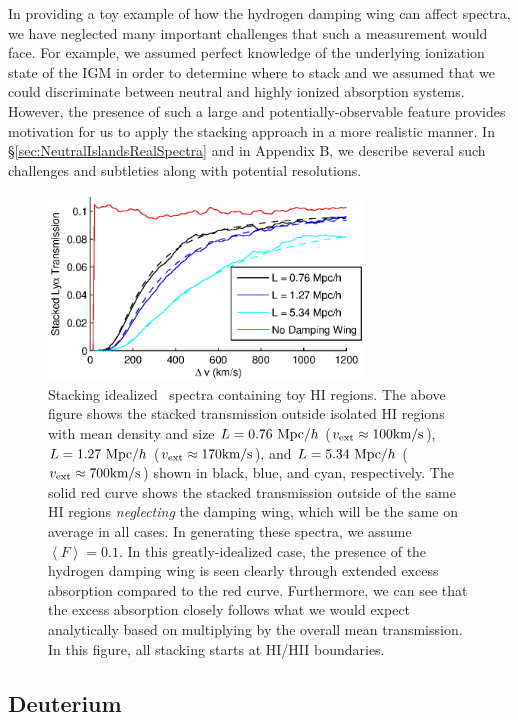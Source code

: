In providing a toy example of how the hydrogen damping wing can affect spectra, we have neglected many important challenges that such a measurement would face. For example, we assumed perfect knowledge of the underlying ionization state of the IGM in order to determine where to stack and we assumed that we could discriminate between neutral and highly ionized absorption systems. However, the presence of such a large and potentially-observable feature provides motivation for us to apply the stacking approach in a more realistic manner. In \S \ref{sec:NeutralIslandsRealSpectra} and in Appendix B, we describe several such challenges and subtleties along with potential resolutions.


\begin{figure}[!ht]
  \centering
  \includegraphics[width=8.4cm]{fig4.eps}
  \caption{Stacking idealized \lya\ spectra containing toy HI regions. The above figure shows the stacked transmission outside isolated HI regions with mean density and size $L = 0.76 \ \text{Mpc/$h$}$ ($v_{\text{ext}} \approx 100\text{km}/\text{s}$), $L = 1.27 \ \text{Mpc/$h$}$ ($v_{\text{ext}} \approx 170\text{km}/\text{s}$), and $L = 5.34 \ \text{Mpc/$h$}$ ($v_{\text{ext}} \approx 700\text{km}/\text{s}$) shown in black, blue, and cyan, respectively. The solid red curve shows the stacked transmission outside of the same HI regions \textit{neglecting} the damping wing, which will be the same on average in all cases. In generating these spectra, we assume $\left\langle F \right\rangle = 0.1$. In this greatly-idealized case, the presence of the hydrogen damping wing is seen clearly through extended excess absorption compared to the red curve. Furthermore, we can see that the excess absorption closely follows what we would expect analytically based on multiplying  by the overall mean transmission. In this figure, all stacking starts at HI/HII boundaries.}
  \label{fig:ToyHI}
\end{figure}


\subsection{Deuterium} \label{sec:NeutralIslandsToyD}



